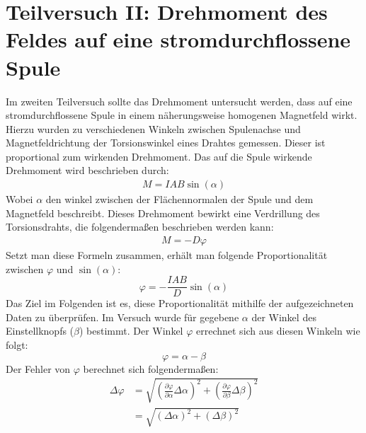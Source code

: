 \documentclass{report}
\begin{document}
\section{Teilversuch II: Drehmoment des Feldes auf eine stromdurchflossene Spule}
Im zweiten Teilversuch sollte das Drehmoment untersucht werden, dass auf eine stromdurchflossene Spule in einem näherungsweise homogenen Magnetfeld  wirkt.
Hierzu wurden zu verschiedenen Winkeln zwischen Spulenachse und Magnetfeldrichtung der Torsionswinkel eines Drahtes gemessen. Dieser ist proportional zum wirkenden 
Drehmoment.
Das auf die Spule wirkende Drehmoment wird beschrieben durch:
\begin{equation}
    \begin{split}
        M = IAB \sin(\alpha)
    \end{split}
\end{equation}
Wobei $\alpha$ den winkel zwischen der Flächennormalen der Spule und dem Magnetfeld beschreibt. Dieses Drehmoment bewirkt eine Verdrillung des Torsionsdrahts,
die folgendermaßen beschrieben werden kann:
\begin{equation}
    \begin{split}
        M = -D \varphi
    \end{split}
\end{equation}
Setzt man diese Formeln zusammen, erhält man folgende Proportionalität zwischen $\varphi$ und $\sin(\alpha)$:
\begin{equation}
    \varphi = - \frac{IAB}{D} \sin(\alpha)
    \label{eq:phiSinAlphaTheor}
\end{equation}
Das Ziel im Folgenden ist es, diese Proportionalität mithilfe der aufgezeichneten Daten zu überprüfen.
Im Versuch wurde für gegebene $\alpha$ der Winkel des Einstellknopfs ($\beta$) bestimmt. Der Winkel $\varphi$ errechnet sich aus diesen Winkeln wie folgt:
\begin{equation}
    \varphi = \alpha - \beta
\end{equation}
Der Fehler von $\varphi$ berechnet sich folgendermaßen:
\begin{equation}
    \begin{split}
        \Delta \varphi &= \sqrt{\left(\frac{\partial \varphi}{\partial \alpha}\Delta \alpha\right)^2 + \left(\frac{\partial \varphi}{\partial \beta}\Delta \beta\right)^2} \\
                    &= \sqrt{(\Delta \alpha)^2 + (\Delta \beta)^2}
    \end{split}
\end{equation}
\end{document}
